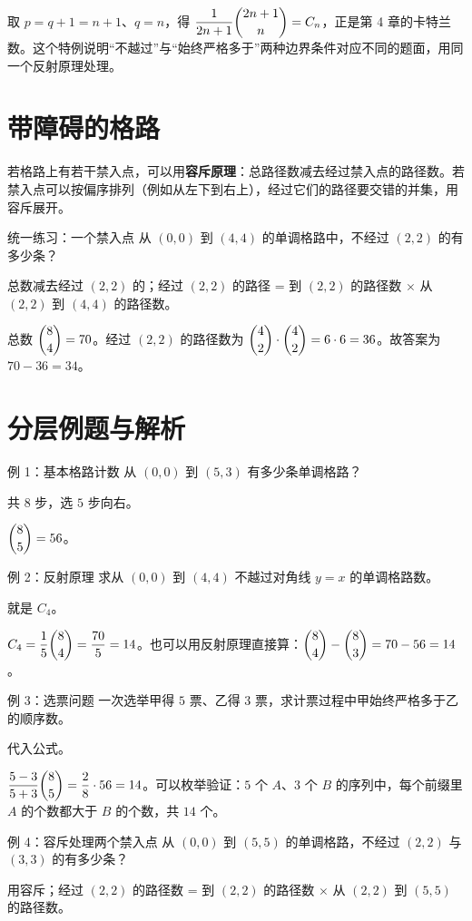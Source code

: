 \begin{tip}[选票问题是卡特兰的一般化]
取 $p=q+1=n+1$、$q=n$，得 $\dfrac{1}{2n+1}\dbinom{2n+1}{n}=C_n$，正是第 4 章的卡特兰数。这个特例说明“不越过”与“始终严格多于”两种边界条件对应不同的题面，用同一个反射原理处理。
\end{tip}

\section{带障碍的格路}
若格路上有若干禁入点，可以用\textbf{容斥原理}：总路径数减去经过禁入点的路径数。若禁入点可以按偏序排列（例如从左下到右上），经过它们的路径要交错的并集，用容斥展开。

\begin{problem}{统一练习：一个禁入点}
从 $(0,0)$ 到 $(4,4)$ 的单调格路中，不经过 $(2,2)$ 的有多少条？
\end{problem}
\hint 总数减去经过 $(2,2)$ 的；经过 $(2,2)$ 的路径 = 到 $(2,2)$ 的路径数 $\times$ 从 $(2,2)$ 到 $(4,4)$ 的路径数。

\sol 总数 $\dbinom84=70$。经过 $(2,2)$ 的路径数为 $\dbinom42\cdot\dbinom42=6\cdot6=36$。故答案为 $70-36=34$。

\section{分层例题与解析}
\begin{problem}{例 1：基本格路计数}
从 $(0,0)$ 到 $(5,3)$ 有多少条单调格路？
\end{problem}
\hint 共 $8$ 步，选 $5$ 步向右。

\sol $\dbinom85=56$。

\begin{problem}{例 2：反射原理}
求从 $(0,0)$ 到 $(4,4)$ 不越过对角线 $y=x$ 的单调格路数。
\end{problem}
\hint 就是 $C_4$。

\sol $C_4=\dfrac15\dbinom84=\dfrac{70}{5}=14$。也可以用反射原理直接算：$\dbinom84-\dbinom8{3}=70-56=14$。

\begin{problem}{例 3：选票问题}
一次选举甲得 $5$ 票、乙得 $3$ 票，求计票过程中甲始终严格多于乙的顺序数。
\end{problem}
\hint 代入公式。

\sol $\dfrac{5-3}{5+3}\dbinom85=\dfrac28\cdot56=14$。可以枚举验证：$5$ 个 $A$、$3$ 个 $B$ 的序列中，每个前缀里 $A$ 的个数都大于 $B$ 的个数，共 $14$ 个。

\begin{problem}{例 4：容斥处理两个禁入点}
从 $(0,0)$ 到 $(5,5)$ 的单调格路，不经过 $(2,2)$ 与 $(3,3)$ 的有多少条？
\end{problem}
\hint 用容斥；经过 $(2,2)$ 的路径数 = 到 $(2,2)$ 的路径数 $\times$ 从 $(2,2)$ 到 $(5,5)$ 的路径数。

